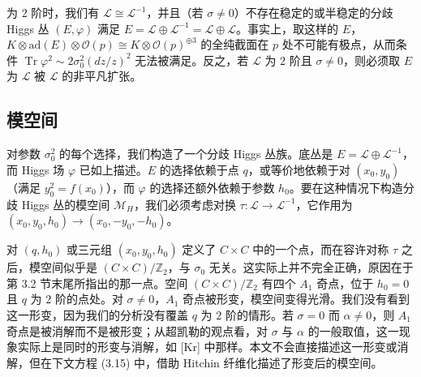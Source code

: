 \documentclass[11pt,a4paper]{article}
\begin{document}
为 $2$ 阶时，我们有 $\mathcal{L}\cong\mathcal{L}^{-1}$，并且（若 $\sigma\ne 0$）不存在稳定的或半稳定的分歧 Higgs 丛 $(E,\varphi)$ 满足 $E=\mathcal{L}\oplus\mathcal{L}^{-1}=\mathcal{L}\oplus\mathcal{L}$。事实上，取这样的 $E$，$K\otimes\mathrm{ad}(E)\otimes\mathcal{O}(p)\cong K\otimes\mathcal{O}(p)^{\oplus 3}$ 的全纯截面在 $p$ 处不可能有极点，从而条件 $\operatorname{Tr}\varphi^2\sim 2\sigma_0^2(dz/z)^2$ 无法被满足。反之，若 $\mathcal{L}$ 为 $2$ 阶且 $\sigma\ne 0$，则必须取 $E$ 为 $\mathcal{L}$ 被 $\mathcal{L}$ 的非平凡扩张。

\subsection{模空间}

对参数 $\sigma_0^2$ 的每个选择，我们构造了一个分歧 Higgs 丛族。底丛是 $E=\mathcal{L}\oplus\mathcal{L}^{-1}$，而 Higgs 场 $\varphi$ 已如上描述。$E$ 的选择依赖于点 $q$，或等价地依赖于对 $(x_0,y_0)$（满足 $y_0^2=f(x_0)$），而 $\varphi$ 的选择还额外依赖于参数 $h_0$。要在这种情况下构造分歧 Higgs 丛的模空间 $\mathcal{M}_H$，我们必须考虑对换 $\tau:\mathcal{L}\to\mathcal{L}^{-1}$，它作用为 $(x_0,y_0,h_0)\to(x_0,-y_0,-h_0)$。

对 $(q,h_0)$ 或三元组 $(x_0,y_0,h_0)$ 定义了 $C\times C$ 中的一个点，而在容许对称 $\tau$ 之后，模空间似乎是 $(C\times C)/\mathbb{Z}_2$，与 $\sigma_0$ 无关。这实际上并不完全正确，原因在于第 3.2 节末尾所指出的那一点。空间 $(C\times C)/\mathbb{Z}_2$ 有四个 $A_1$ 奇点，位于 $h_0=0$ 且 $q$ 为 $2$ 阶的点处。对 $\sigma\ne 0$，$A_1$ 奇点被形变，模空间变得光滑。我们没有看到这一形变，因为我们的分析没有覆盖 $q$ 为 $2$ 阶的情形。若 $\sigma=0$ 而 $\alpha\ne 0$，则 $A_1$ 奇点是被消解而不是被形变；从超凯勒的观点看，对 $\sigma$ 与 $\alpha$ 的一般取值，这一现象实际上是同时的形变与消解，如 [Kr] 中那样。本文不会直接描述这一形变或消解，但在下文方程 (3.15) 中，借助 Hitchin 纤维化描述了形变后的模空间。
\end{document}
